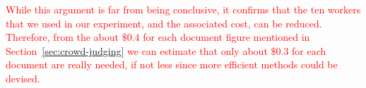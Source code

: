 \textcolor{red}{While this argument is far from being conclusive, it
confirms that the ten workers that we used in our experiment, and the
associated cost, can be reduced.
Therefore, from the about $\$0.4$ for each document figure mentioned in
Section~\ref{sec:crowd-judging} we can estimate that only about $\$0.3$
for each document are really needed, if not less since more efficient
methods could be devised.} 



